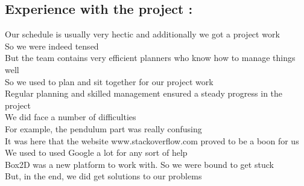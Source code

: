 \documentclass{article}
\begin{document}
\subsection*{Experience with the project : }
\hspace*{5 mm}Our schedule is usually very hectic and additionally we got a project work \\
\hspace*{5 mm}So we were indeed tensed \\
\hspace*{5 mm}But the team contains very efficient planners who know how to manage things well \\
\hspace*{5 mm}So we used to plan and sit together for our project work \\
\hspace*{5 mm}Regular planning and skilled management ensured a steady progress in the project \\
\hspace*{5 mm}We did face a number of difficulties \\
\hspace*{5 mm}For example, the pendulum part was really confusing \\
\hspace*{5 mm}It was here that the website www.stackoverflow.com proved to be a boon for us \\
\hspace*{5 mm}We used to used Google a lot for any sort of help \\
\hspace*{5 mm}Box2D was a new platform to work with. So we were bound to get stuck \\
\hspace*{5 mm}But, in the end, we did get solutions to our problems \\
\pagebreak
\end{document}
